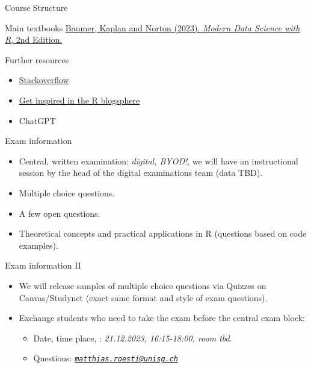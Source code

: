\documentclass[
  ignorenonframetext,
]{beamer}
\providecommand{\tightlist}{%
  \setlength{\itemsep}{0pt}\setlength{\parskip}{0pt}}
\begin{document}
\begin{frame}[fragile]{Course Structure}
\begin{block}{Main textbooks}
\href{https://mdsr-book.github.io/mdsr3e/}{Baumer, Kaplan and Norton
(2023). \emph{Modern Data Science with R}, 2nd Edition.}
\end{block}

\begin{block}{Further resources}
\protect\hypertarget{further-resources}{}
\begin{itemize}
\tightlist
\item
  \href{https://stackoverflow.com/questions}{Stackoverflow}
\item
  \href{https://www.r-bloggers.com}{Get inspired in the R blogsphere}
\item
  ChatGPT
\end{itemize}
\end{block}

\begin{block}{Exam information}
\protect\hypertarget{exam-information}{}
\begin{itemize}
\tightlist
\item
  Central, written examination: \emph{digital, BYOD!}, we will have an
  instructional session by the head of the digital examinations team
  (data TBD).
\item
  Multiple choice questions.
\item
  A few open questions.
\item
  Theoretical concepts and practical applications in R (questions based
  on code examples).
\end{itemize}
\end{block}

\begin{block}{Exam information II}
\protect\hypertarget{exam-information-ii}{}
\begin{itemize}
\tightlist
\item
  We will release samples of multiple choice questions via Quizzes on
  Canvas/Studynet (exact same format and style of exam questions).
\item
  Exchange students who need to take the exam before the central exam
  block:

  \begin{itemize}
  \tightlist
  \item
    Date, time place, : \emph{21.12.2023, 16:15-18:00, room tbd}.
  \item
    Questions:
    \emph{\href{mailto:matthias.roesti@unisg.ch}{\nolinkurl{matthias.roesti@unisg.ch}}}
  \end{itemize}
\end{itemize}
\end{block}


\end{frame}
\end{document}
